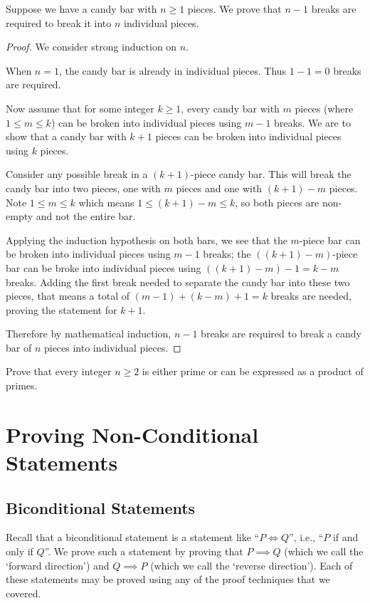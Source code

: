 \begin{example}
    Suppose we have a candy bar with $n \geq 1$ pieces. We prove that $n - 1$ breaks are required to break it into $n$ individual pieces.
    \begin{proof}
        We consider strong induction on $n$.

        When $n = 1$, the candy bar is already in individual pieces. Thus $1 - 1 = 0$ breaks are required.

        Now assume that for some integer $k \geq 1$, every candy bar with $m$ pieces (where $1 \leq m \leq k$) can be broken into individual pieces using $m - 1$ breaks. We are to show that a candy bar with $k + 1$ pieces can be broken into individual pieces using $k$ pieces.

        Consider any possible break in a $(k + 1)$-piece candy bar. This will break the candy bar into two pieces, one with $m$ pieces and one with $(k+1)-m$ pieces. Note $1 \leq m \leq k$ which means $1 \leq (k+1)-m \leq k$, so both pieces are non-empty and not the entire bar.

        Applying the induction hypothesis on both bars, we see that the $m$-piece bar can be broken into individual pieces using $m-1$ breaks; the $((k+1)-m)$-piece bar can be broke into individual pieces using $((k+1)-m)-1 = k-m$ breaks. Adding the first break needed to separate the candy bar into these two pieces, that means a total of $(m-1) + (k-m) + 1 = k$ breaks are needed, proving the statement for $k+1$.

        Therefore by mathematical induction, $n - 1$ breaks are required to break a candy bar of $n$ pieces into individual pieces.
    \end{proof}
\end{example}

\begin{exercise}
    Prove that every integer $n \geq 2$ is either prime or can be expressed as a product of primes.
\end{exercise}

\section{Proving Non-Conditional Statements}
\subsection{Biconditional Statements}
Recall that a biconditional statement is a statement like ``$P \iff Q$'', i.e., ``$P$ if and only if $Q$''. We prove such a statement by proving that $P \implies Q$ (which we call the `forward direction') and $Q \implies P$ (which we call the `reverse direction'). Each of these statements may be proved using any of the proof techniques that we covered.

